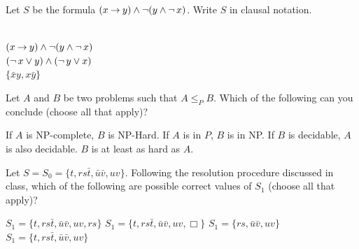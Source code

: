 \documentclass[addpoints]{exam}
\begin{document}
\begin{questions}
\question[2] Let $S$ be the formula $(x \mathbin{\rightarrow} y) \land \mathop{\neg} (y \land \mathop{\neg} x)$. Write $S$ in clausal notation.
\begin{solution}
~\\
$(x \mathbin{\rightarrow} y)\land \mathop{\neg} (y \land \mathop{\neg} x)$\\
$(\mathop{\neg} x \lor y) \land (\mathop{\neg} y \lor x)$\\
$\{\bar{x}y,x\bar{y}\}$\\
\end{solution}
\vspace{30mm}

\question[2] Let $A$ and $B$ be two problems such that $A \leq_{P} B$. Which of
the following can you conclude (choose all that apply)?
\begin{checkboxes}
\CorrectChoice If $A$ is NP-complete, $B$ is NP-Hard.
\choice If $A$ is in $P$, $B$ is in NP. 
\CorrectChoice If $B$ is decidable, $A$ is also decidable.
\CorrectChoice $B$ is at least as hard as $A$.
\end{checkboxes}

\vspace{10mm}
\question[2] Let $S = S_0 = \{t,rs\bar{t},\bar{u}\bar{v},uv\}$. Following the resolution
procedure discussed in class, which of the following are possible correct
values of $S_1$ (choose all that apply)?
\begin{checkboxes}
\CorrectChoice $S_1 = \{t,rs\bar{t},\bar{u}\bar{v},uv, rs\}$ 
\choice $S_1 = \{t,rs\bar{t},\bar{u}\bar{v},uv, \Box \}$ 
\choice $S_1 = \{rs,\bar{u}\bar{v},uv\}$ 
\CorrectChoice $S_1 = \{t,rs\bar{t},\bar{u}\bar{v},uv\}$ 
\end{checkboxes}


\vspace{5mm}

\end{questions}
\end{document}
